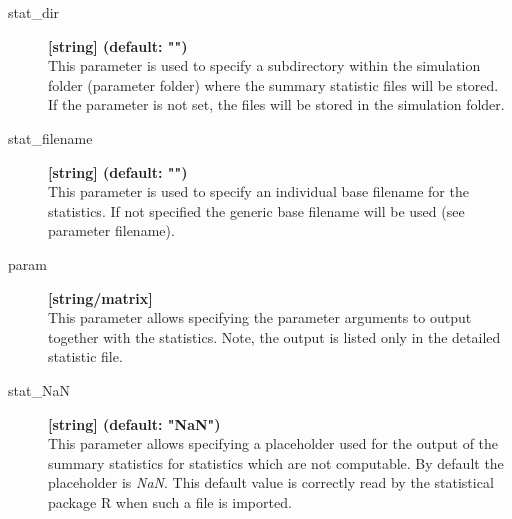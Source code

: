 \documentclass[letterpaper,12pt,oneside]{book}
\begin{document}
\begin{description}
\item[stat\_dir] \textbf{[string] (default: "")}\\
This parameter is used to specify a subdirectory within the simulation folder (parameter \textsf{folder}) where the summary statistic files will be stored. If the parameter is not set, the files will be stored in the simulation folder.

\item[stat\_filename] \textbf{[string] (default: "")}\\
This parameter is used to specify an individual base filename for the statistics. If not specified the generic base filename will be used (see parameter \textsf{filename}).



\item[param] \textbf{[string/matrix]}\\
This parameter allows specifying the parameter arguments to output together with the statistics. Note, the output is listed only in the detailed statistic file.

\item[stat\_NaN] \textbf{[string] (default: "NaN")}\\
This parameter allows specifying a placeholder used for the output of the summary statistics for statistics which are not computable. By default the placeholder is \textit{NaN}. This default value is correctly read by the statistical package R when such a file is imported.

\end{description}
\end{document}
